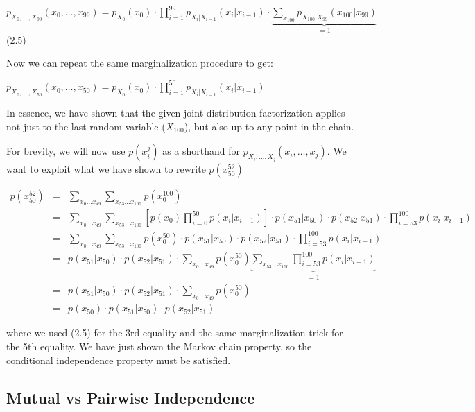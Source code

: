 \documentclass[6008notes.tex]{subfiles}
\begin{document}
{\centering$p_{X_0, \dots , X_{99}}(x_0, \dots , x_{99}) = p_{X_0}(x_0) \cdot \prod _{i=1}^{99} p_{X_ i | X_{i-1}}(x_ i | x_{i-1}) \cdot \underbrace{\sum _{x_{100}} p_{X_{100}|X_{99}}(x_{100}|x_{99})}_{= 1} \qquad\qquad$ (2.5) \par}
 
Now we can repeat the same marginalization procedure to get:

{\centering$p_{X_0, \dots , X_{50}}(x_0, \dots , x_{50}) = p_{X_0}(x_0) \cdot \prod _{i=1}^{50} p_{X_ i | X_{i-1}}(x_ i | x_{i-1})$ \par}

In essence, we have shown that the given joint distribution factorization applies not just to the last random variable ($X_{100}$), but also up to any point in the chain.

For brevity, we will now use $p(x_{i}^{j})$ as a shorthand for $p_{X_ i, \dots , X_{j}}(x_ i, \dots , x_{j})$. We want to exploit what we have shown to rewrite $p(x_{50}^{52})$

\begin{eqnarray*}
		p(x_{50}^{52})
        &=& \sum_{x_{0} \dots x_{49}} \sum_{x_{53} \dots x_{100}} p(x_{0}^{100}) \\
		&=& \sum_{x_{0} \dots x_{49}} \sum_{x_{53} \dots x_{100}} \left[p(x_{0}) \prod_{i=0}^{50} p(x_{i}|x_{i-1})\right] \cdot p(x_{51}|x_{50}) \cdot p(x_{52}|x_{51}) \cdot \prod_{i=53}^{100} p(x_{i}|x_{i-1}) \\
		&=& \sum_{x_{0} \dots x_{49}} \sum_{x_{53} \dots x_{100}} p(x_{0}^{50}) \cdot p(x_{51}|x_{50}) \cdot p(x_{52}|x_{51}) \cdot \prod_{i=53}^{100} p(x_{i}|x_{i-1}) \\
		&=& p(x_{51}|x_{50}) \cdot p(x_{52}|x_{51}) \cdot \sum_{x_{0} \dots x_{49}} p(x_{0}^{50}) \underbrace{\sum_{x_{53} \dots x_{100}} \prod_{i=53}^{100} p(x_{i}|x_{i-1})}_{=1} \\
		&=& p(x_{51}|x_{50}) \cdot p(x_{52}|x_{51}) \cdot \sum_{x_{0} \dots x_{49}} p(x_{0}^{50}) \\
		&=& p(x_{50}) \cdot p(x_{51}|x_{50}) \cdot p(x_{52}|x_{51})
    \end{eqnarray*}
		
where we used (2.5) for the 3rd equality and the same marginalization trick for the 5th equality. We have just shown the Markov chain property, so the conditional independence property must be satisfied.

\subsection{Mutual vs Pairwise Independence}
\end{document}
